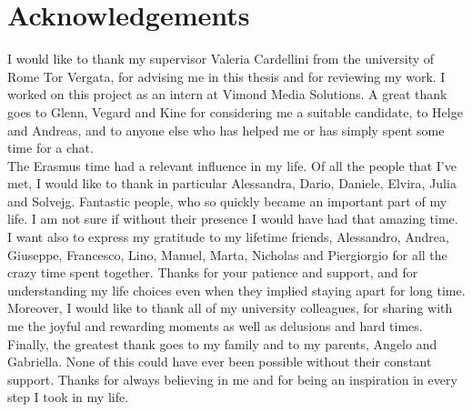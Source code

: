 \chapter*{Acknowledgements}
I would like to thank my supervisor Valeria Cardellini from the university of Rome Tor Vergata, for advising me in this thesis and for reviewing my work. I worked on this project as an intern at Vimond Media Solutions. A great thank goes to Glenn, Vegard and Kine for considering me a suitable candidate, to Helge and Andreas, and to anyone else who has helped me or  has simply spent some time for a chat.\\
The Erasmus time had a relevant influence in my life. Of all the people that I've met, I would like to thank in particular Alessandra, Dario, Daniele, Elvira, Julia and Solvejg. Fantastic people, who so quickly became an important part of my life. I am not sure if without their presence I would have had that amazing time.\\
I want also to express my gratitude to my lifetime friends, Alessandro, Andrea, Giuseppe, Francesco, Lino, Manuel, Marta, Nicholas and Piergiorgio for all the crazy time spent together. Thanks for your patience and support, and for understanding my life choices even when they implied staying apart for long time.\\
Moreover, I would like to thank all of my university colleagues, for sharing with me the joyful and rewarding moments as well as delusions and hard times.\\
Finally, the greatest thank goes to my family and to my parents, Angelo and Gabriella. None of this could have ever been possible without their constant support. Thanks for always believing in me and for being an inspiration in every step I took in my life.
